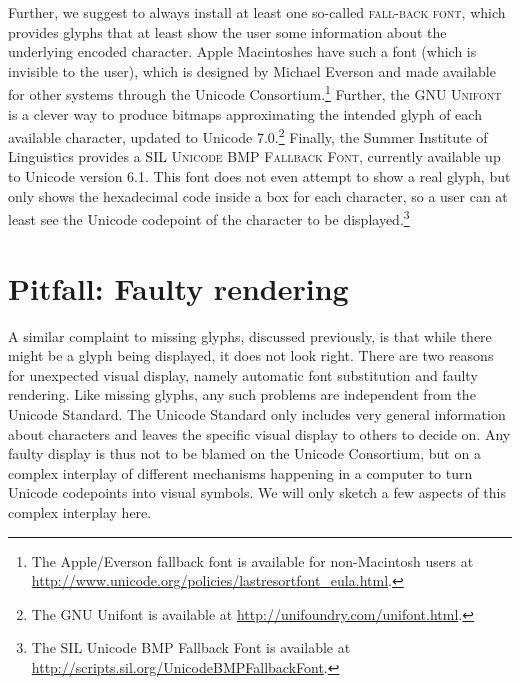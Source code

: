 Further, we suggest to always install at least one so-called \textsc{fall-back
font}, which provides glyphs that at least show the user some information about
the underlying encoded character. Apple Macintoshes have such a font (which is
invisible to the user), which is designed by Michael Everson and made available
for other systems through the Unicode Consortium.\footnote{The Apple/Everson
fallback font is available for non-Macintosh users at \newline
\url{http://www.unicode.org/policies/lastresortfont\_eula.html}.} Further, the
\textsc{GNU Unifont} is a clever way to produce bitmaps approximating the
intended glyph of each available character, updated to Unicode 7.0.\footnote{The
GNU Unifont is available at \url{http://unifoundry.com/unifont.html}.} Finally,
the Summer Institute of Linguistics provides a \textsc{SIL Unicode BMP Fallback
Font}, currently available up to Unicode version 6.1. This font does not even
attempt to show a real glyph, but only shows the hexadecimal code inside a box
for each character, so a user can at least see the Unicode codepoint of the
character to be displayed.\footnote{The SIL Unicode BMP Fallback Font is
available at \newline \url{http://scripts.sil.org/UnicodeBMPFallbackFont}.}

\section{Pitfall: Faulty rendering}
\label{pitfall-faulty-rendering}

A similar complaint to missing glyphs, discussed previously, is that while there
might be a glyph being displayed, it does not look right. There are two
reasons for unexpected visual display, namely automatic font substitution and
faulty rendering. Like missing glyphs, any such problems are independent from
the Unicode Standard. The Unicode Standard only includes very general
information about characters and leaves the specific visual display to others to
decide on. Any faulty display is thus not to be blamed on the Unicode
Consortium, but on a complex interplay of different mechanisms happening in a
computer to turn Unicode codepoints into visual symbols. We will only sketch a
few aspects of this complex interplay here.

